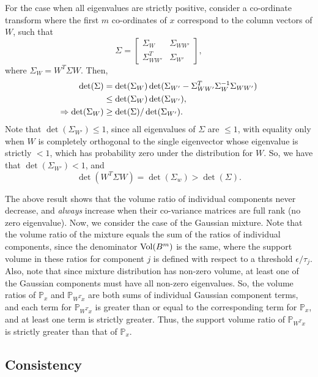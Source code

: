 \documentclass{article}
\newcommand{\px}{\mathbb{P}_{x}}
\newcommand{\pwx}{\mathbb{P}_{W^Tx}}
\begin{document}
For the case when all eigenvalues are strictly positive, consider a co-ordinate transform where the first $m$ co-ordinates of $x$ correspond to the column vectors of $W$, such that
\begin{equation}
  \Sigma = \left[\begin{array}{cc} \Sigma_W & \Sigma_{WW'}\\\Sigma_{WW'}^T & \Sigma_{W'}\end{array}\right],
\end{equation}
where $\Sigma_W = W^T\Sigma W$. Then,
\begin{align}
  \det(\Sigma) &= \det(\Sigma_W)\det(\Sigma_{W'}-\Sigma_{WW'}^T\Sigma_W^{-1}\Sigma_{WW'})\notag\\
               &\leq \det(\Sigma_W)\det(\Sigma_{W'}),\notag\\
  \Rightarrow \det(\Sigma_W) &\geq \det(\Sigma) / \det(\Sigma_{W'}).
\end{align}
Note that $\det(\Sigma_{W'}) \leq 1$, since all eigenvalues of $\Sigma$ are $\leq 1$, with equality only when $W$ is completely orthogonal to the single eigenvector whose eigenvalue is strictly $< 1$, which has probability zero under the distribution for $W$. So, we have that $\det(\Sigma_{W'}) < 1$, and
\begin{equation}
  \label{eq:detinc}
  \det(W^T \Sigma W) = \det(\Sigma_w) > \det(\Sigma).
\end{equation}

The above result shows that the volume ratio of individual components never decrease, and \emph{always} increase when their co-variance matrices are full rank (no zero eigenvalue). Now, we consider the case of the Gaussian mixture. Note that the volume ratio of the mixture equals the sum of the ratios of individual components, since the denominator $\mbox{Vol}(B^m)$ is the same, where the support volume in these ratios for component $j$ is defined with respect to a threshold $\epsilon / \tau_j$. Also, note that since mixture distribution has non-zero volume, at least one of the Gaussian components must have all non-zero eigenvalues. So, the volume ratios of $\px$ and $\pwx$ are both sums of individual Gaussian component terms, and each term for $\pwx$ is greater than or equal to the corresponding term for $\px$, and at least one term is strictly greater. Thus, the support volume ratio of $\pwx$ is strictly greater than that of $\px$.

\subsection*{Consistency}
\end{document}
